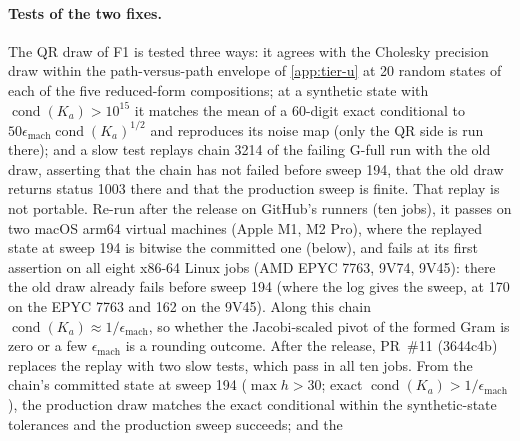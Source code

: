 \paragraph{Tests of the two fixes.}\label{app:float64-tests}
The QR draw of F1 is tested three ways: it agrees with the Cholesky precision draw within the
path-versus-path envelope of \cref{app:tier-u} at 20 random states of each of the five
reduced-form compositions; at a synthetic state with $\operatorname{cond}(K_a) > 10^{15}$ it matches
the mean of a 60-digit exact conditional to $50\epsilon_{\mathrm{mach}}\operatorname{cond}(K_a)^{1/2}$
and reproduces its noise map (only the QR side is run there); and a slow test replays chain 3214 of
the failing G-full run with the old draw, asserting that the chain has not failed before sweep 194,
that the old draw returns status 1003 there and that the production sweep is finite.
That replay is not portable. Re-run after the release on GitHub's runners (ten jobs), it passes on
two macOS arm64 virtual machines (Apple M1, M2 Pro), where the replayed state at sweep 194 is bitwise
the committed one (below), and fails at its first assertion on all eight x86-64 Linux jobs (AMD EPYC
7763, 9V74, 9V45): there the old draw already fails before sweep 194 (where the log gives the sweep,
at 170 on the EPYC 7763 and 162 on the 9V45).
Along this chain $\operatorname{cond}(K_a) \approx 1/\epsilon_{\mathrm{mach}}$, so whether the
Jacobi-scaled pivot of the formed Gram is zero or a few $\epsilon_{\mathrm{mach}}$ is a rounding outcome.
After the release, PR~\#11 (3644c4b) replaces the replay with two slow tests, which pass in all
ten jobs. From the chain's committed state at sweep 194 ($\max h > 30$; exact
$\operatorname{cond}(K_a) > 1/\epsilon_{\mathrm{mach}}$), the production draw matches the exact
conditional within the synthetic-state tolerances and the production sweep succeeds; and the
